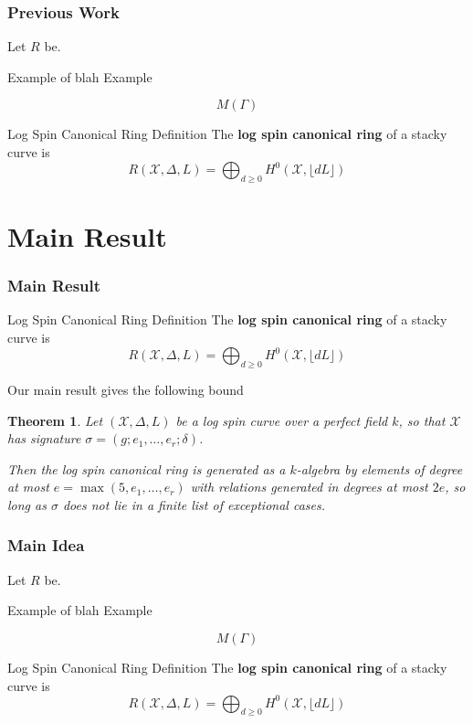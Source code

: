 \documentclass{beamer}
\newtheorem{thm}{Theorem}
\theoremstyle{remark}
\newcommand \sx{{\mathscr X}}
\newcommand{\halfcan}{L}
\begin{document}
\begin{frame}
\frametitle{Previous Work}
Let $R$ be.

\pause
\begin{exampleblock}{Example of blah}
Example
\end{exampleblock}

\pause
\[
   M(\Gamma)
\]

\pause
\begin{alertblock}{Log Spin Canonical Ring Definition}
The \textbf{log spin canonical ring} of a stacky curve is
\[
	R(\sx, \Delta, \halfcan) = \bigoplus_{d \geq 0} H^0(\sx, \lfloor d \halfcan \rfloor)
\]
\end{alertblock}

\end{frame}

\section{Main Result}

\begin{frame}
\frametitle{Main Result}
\begin{alertblock}{Log Spin Canonical Ring Definition}
The \textbf{log spin canonical ring} of a stacky curve is
\[
	R(\sx, \Delta, \halfcan) = \bigoplus_{d \geq 0} H^0(\sx, \lfloor d \halfcan \rfloor)
\]
\end{alertblock}

Our main result gives the following bound

\pause
\begin{thm}
\label{thm:main}
Let $(\sx, \Delta, \halfcan)$ be a log spin curve over a perfect
field $k$, so that $\sx$ has signature $\sigma = (g; e_1, \ldots,
e_r; \delta)$.

Then the log spin canonical ring is generated as a $k$-algebra by 
elements of degree at most $e = \max(5, e_1, \ldots, e_r)$ with
relations generated in degrees at most $2e$,
so long as $\sigma$ does not lie in a finite list of exceptional
cases.
\end{thm}

\end{frame} 

\begin{frame}
\frametitle{Main Idea}
Let $R$ be.

\pause
\begin{exampleblock}{Example of blah}
Example
\end{exampleblock}

\pause
\[
   M(\Gamma)
\]

\pause
\begin{alertblock}{Log Spin Canonical Ring Definition}
The \textbf{log spin canonical ring} of a stacky curve is
\[
	R(\sx, \Delta, \halfcan) = \bigoplus_{d \geq 0} H^0(\sx, \lfloor d \halfcan \rfloor)
\]
\end{alertblock}

\end{frame}
\end{document}
